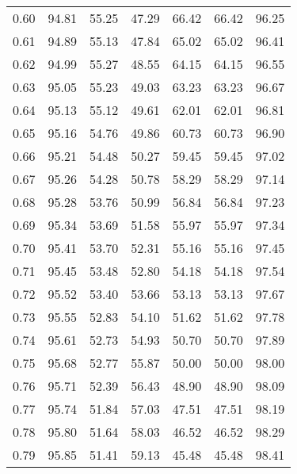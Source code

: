 \begin{tabular}{|c|c|c|c|c|c|c|}
      0.60 &     94.81 &     55.25 &      47.29 &   66.42 &      66.42 &         96.25 \\
      0.61 &     94.89 &     55.13 &      47.84 &   65.02 &      65.02 &         96.41 \\
      0.62 &     94.99 &     55.27 &      48.55 &   64.15 &      64.15 &         96.55 \\
      0.63 &     95.05 &     55.23 &      49.03 &   63.23 &      63.23 &         96.67 \\
      0.64 &     95.13 &     55.12 &      49.61 &   62.01 &      62.01 &         96.81 \\
      0.65 &     95.16 &     54.76 &      49.86 &   60.73 &      60.73 &         96.90 \\
      0.66 &     95.21 &     54.48 &      50.27 &   59.45 &      59.45 &         97.02 \\
      0.67 &     95.26 &     54.28 &      50.78 &   58.29 &      58.29 &         97.14 \\
      0.68 &     95.28 &     53.76 &      50.99 &   56.84 &      56.84 &         97.23 \\
      0.69 &     95.34 &     53.69 &      51.58 &   55.97 &      55.97 &         97.34 \\
      0.70 &     95.41 &     53.70 &      52.31 &   55.16 &      55.16 &         97.45 \\
      0.71 &     95.45 &     53.48 &      52.80 &   54.18 &      54.18 &         97.54 \\
      0.72 &     95.52 &     53.40 &      53.66 &   53.13 &      53.13 &         97.67 \\
      0.73 &     95.55 &     52.83 &      54.10 &   51.62 &      51.62 &         97.78 \\
      0.74 &     95.61 &     52.73 &      54.93 &   50.70 &      50.70 &         97.89 \\
      0.75 &     95.68 &     52.77 &      55.87 &   50.00 &      50.00 &         98.00 \\
      0.76 &     95.71 &     52.39 &      56.43 &   48.90 &      48.90 &         98.09 \\
      0.77 &     95.74 &     51.84 &      57.03 &   47.51 &      47.51 &         98.19 \\
      0.78 &     95.80 &     51.64 &      58.03 &   46.52 &      46.52 &         98.29 \\
      0.79 &     95.85 &     51.41 &      59.13 &   45.48 &      45.48 &         98.41 \\

\end{tabular}
